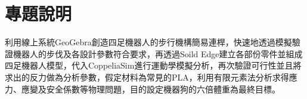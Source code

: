 \section{專題說明}
利用線上系統GeoGebra創造四足機器人的步行機構簡易連桿，快速地透過模擬驗證機器人的步伐及各設計參數符合要求，再透過Soild Edge建立各部份零件並組成四足機器人模型，代入CoppeliaSim進行運動學模擬分析，再次驗證可行性並且將求出的反力做為分析參數，假定材料為常見的PLA，利用有限元素法分析求得應力、應變及安全係數等物理問題，目的設定機器狗的六倍體重為最終目標。\\

\renewcommand{\baselinestretch}{0.5} %
